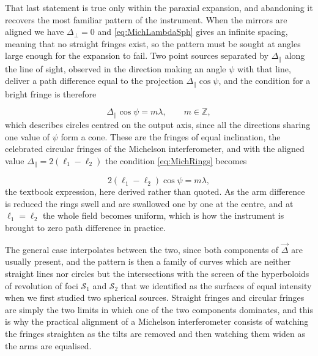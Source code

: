        That last statement is true only within the paraxial expansion, and abandoning it recovers the most familiar pattern of the instrument. When the mirrors are aligned we have $\Delta_\perp = 0$ and \ref{eq:MichLambdaSph} gives an infinite spacing, meaning that no straight fringes exist, so the pattern must be sought at angles large enough for the expansion to fail. Two point sources separated by $\Delta_\parallel$ along the line of sight, observed in the direction making an angle $\psi$ with that line, deliver a path difference equal to the projection $\Delta_\parallel\cos\psi$, and the condition for a bright fringe is therefore

        \begin{equation}\label{eq:MichRings}
            \Delta_\parallel\cos\psi = m\lambda, \qquad m \in \mathbb{Z},
        \end{equation}
        which describes circles centred on the output axis, since all the directions sharing one value of $\psi$ form a cone. These are the fringes of equal inclination, the celebrated circular fringes of the Michelson interferometer, and with the aligned value $\Delta_\parallel = 2(\ell_1-\ell_2)$ the condition \ref{eq:MichRings} becomes

        \begin{equation}\label{eq:MichRingsAligned}
            2\left(\ell_1-\ell_2\right)\cos\psi = m\lambda,
        \end{equation}
        the textbook expression, here derived rather than quoted. As the arm difference is reduced the rings swell and are swallowed one by one at the centre, and at $\ell_1 = \ell_2$ the whole field becomes uniform, which is how the instrument is brought to zero path difference in practice.

        The general case interpolates between the two, since both components of $\vec{\Delta}$ are usually present, and the pattern is then a family of curves which are neither straight lines nor circles but the intersections with the screen of the hyperboloids of revolution of foci $\mathcal{S}_1$ and $\mathcal{S}_2$ that we identified as the surfaces of equal intensity when we first studied two spherical sources. Straight fringes and circular fringes are simply the two limits in which one of the two components dominates, and this is why the practical alignment of a Michelson interferometer consists of watching the fringes straighten as the tilts are removed and then watching them widen as the arms are equalised.


